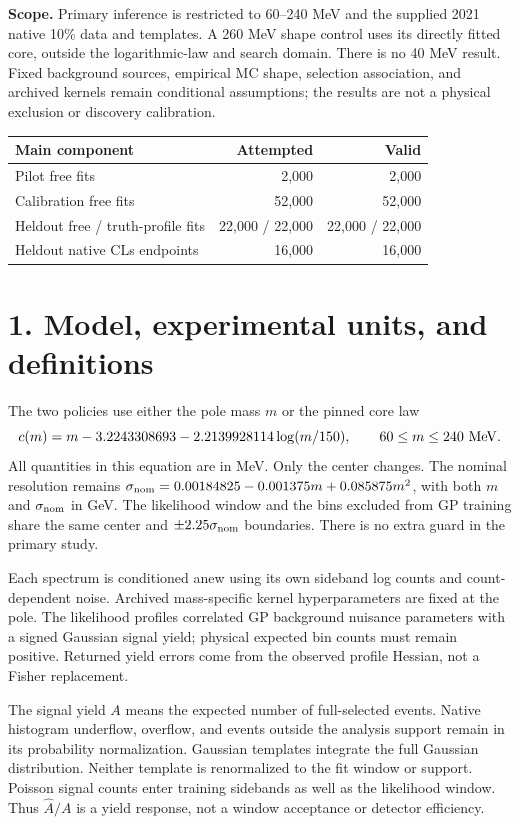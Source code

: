 \documentclass[10pt]{article}
\newcommand{\Ah}{\widehat A}\newcommand{\sh}{\widehat\sigma}
\begin{document}
\textbf{Scope.} Primary inference is restricted to 60--240 MeV and the supplied 2021 native 10\% data and templates. A 260 MeV shape control uses its directly fitted core, outside the logarithmic-law and search domain. There is no 40 MeV result. Fixed background sources, empirical MC shape, selection association, and archived kernels remain conditional assumptions; the results are not a physical exclusion or discovery calibration.
\begin{center}\small\begin{tabular}{lrr}\toprule
Main component & Attempted & Valid\\\midrule
Pilot free fits & 2,000 & 2,000\\
Calibration free fits & 52,000 & 52,000\\
Heldout free / truth-profile fits & 22,000 / 22,000 & 22,000 / 22,000\\
Heldout native CLs endpoints & 16,000 & 16,000\\
\bottomrule\end{tabular}\end{center}\clearpage\section*{1. Model, experimental units, and definitions}

The two policies use either the pole mass $m$ or the pinned core law
\[
c(m)=m-3.2243308693-2.2139928114\log(m/150),\qquad 60\le m\le240\ {\rm MeV}.
\]
All quantities in this equation are in MeV. Only the center changes. The nominal resolution remains $\sigma_{\rm nom}=0.00184825-0.001375m+0.085875m^2$, with both $m$ and $\sigma_{\rm nom}$ in GeV. The likelihood window and the bins excluded from GP training share the same center and $\pm2.25\sigma_{\rm nom}$ boundaries. There is no extra guard in the primary study.

Each spectrum is conditioned anew using its own sideband log counts and count-dependent noise. Archived mass-specific kernel hyperparameters are fixed at the pole. The likelihood profiles correlated GP background nuisance parameters with a signed Gaussian signal yield; physical expected bin counts must remain positive. Returned yield errors come from the observed profile Hessian, not a Fisher replacement.

The signal yield $A$ means the expected number of full-selected events. Native histogram underflow, overflow, and events outside the analysis support remain in its probability normalization. Gaussian templates integrate the full Gaussian distribution. Neither template is renormalized to the fit window or support. Poisson signal counts enter training sidebands as well as the likelihood window. Thus $\Ah/A$ is a yield response, not a window acceptance or detector efficiency.
\end{document}
